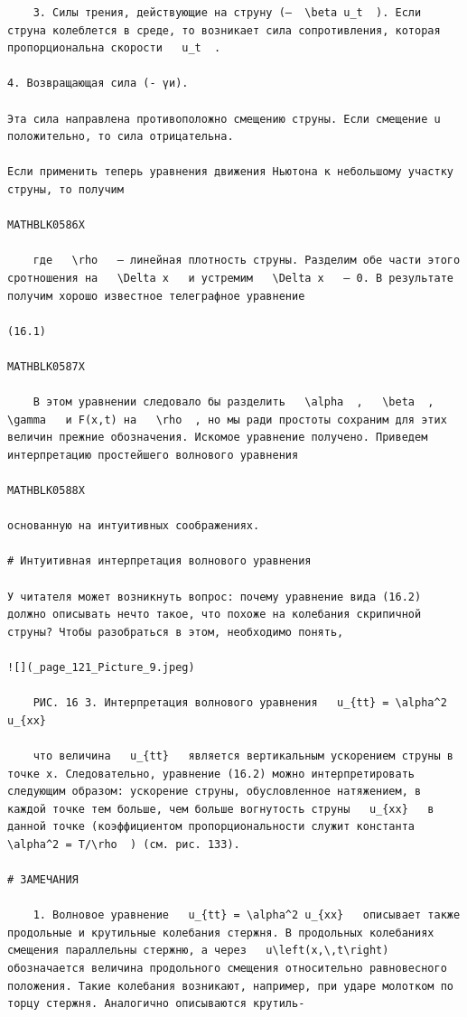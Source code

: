 \documentclass[
]{article}
\begin{document}
\begin{verbatim}
    3. Силы трения, действующие на струну (—  \beta u_t  ). Если струна колеблется в среде, то возникает сила сопротивления, которая пропорциональна скорости   u_t  .

4. Возвращающая сила (- үи).

Эта сила направлена противоположно смещению струны. Если смещение u положительно, то сила отрицательна.

Если применить теперь уравнения движения Ньютона к небольшому участку струны, то получим

MATHBLK0586X

    где   \rho   — линейная плотность струны. Разделим обе части этого сротношения на   \Delta x   и устремим   \Delta x   — 0. В результате получим хорошо известное телеграфное уравнение

(16.1)

MATHBLK0587X

    В этом уравнении следовало бы разделить   \alpha  ,   \beta  ,   \gamma   и F(x,t) на   \rho  , но мы ради простоты сохраним для этих величин прежние обозначения. Искомое уравнение получено. Приведем интерпретацию простейшего волнового уравнения

MATHBLK0588X

основанную на интуитивных соображениях.

# Интуитивная интерпретация волнового уравнения

У читателя может возникнуть вопрос: почему уравнение вида (16.2) должно описывать нечто такое, что похоже на колебания скрипичной струны? Чтобы разобраться в этом, необходимо понять,

![](_page_121_Picture_9.jpeg)

    РИС. 16 3. Интерпретация волнового уравнения   u_{tt} = \alpha^2 u_{xx} 

    что величина   u_{tt}   является вертикальным ускорением струны в точке x. Следовательно, уравнение (16.2) можно интерпретировать следующим образом: ускорение струны, обусловленное натяжением, в каждой точке тем больше, чем больше вогнутость струны   u_{xx}   в данной точке (коэффициентом пропорциональности служит константа   \alpha^2 = T/\rho  ) (см. рис. 133).

# ЗАМЕЧАНИЯ

    1. Волновое уравнение   u_{tt} = \alpha^2 u_{xx}   описывает также продольные и крутильные колебания стержня. В продольных колебаниях смещения параллельны стержню, а через   u\left(x,\,t\right)   обозначается величина продольного смещения относительно равновесного положения. Такие колебания возникают, например, при ударе молотком по торцу стержня. Аналогично описываются крутиль-


\end{verbatim}
\end{document}
